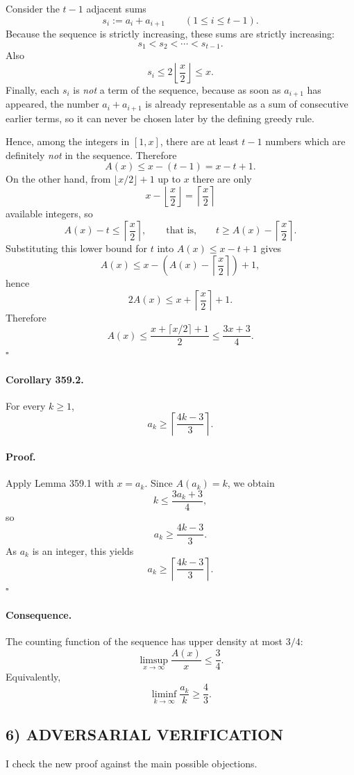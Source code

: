 Consider the $t-1$ adjacent sums
\[
s_i:=a_i+a_{i+1}\qquad (1\le i\le t-1).
\]
Because the sequence is strictly increasing, these sums are strictly increasing:
\[
s_1<s_2<\cdots<s_{t-1}.
\]
Also
\[
s_i\le 2\left\lfloor \frac{x}{2}\right\rfloor\le x.
\]
Finally, each $s_i$ is \emph{not} a term of the sequence, because as soon as $a_{i+1}$ has appeared, the number $a_i+a_{i+1}$ is already representable as a sum of consecutive earlier terms, so it can never be chosen later by the defining greedy rule.

Hence, among the integers in $[1,x]$, there are at least $t-1$ numbers which are definitely \emph{not} in the sequence.  Therefore
\[
A(x)\le x-(t-1)=x-t+1.
\]
On the other hand, from $\lfloor x/2\rfloor+1$ up to $x$ there are only
\[
x-\left\lfloor \frac{x}{2}\right\rfloor=\left\lceil \frac{x}{2}\right\rceil
\]
available integers, so
\[
A(x)-t\le \left\lceil \frac{x}{2}\right\rceil,
\qquad\text{that is,}\qquad
t\ge A(x)-\left\lceil \frac{x}{2}\right\rceil.
\]
Substituting this lower bound for $t$ into $A(x)\le x-t+1$ gives
\[
A(x)\le x-\left(A(x)-\left\lceil \frac{x}{2}\right\rceil\right)+1,
\]
hence
\[
2A(x)\le x+\left\lceil \frac{x}{2}\right\rceil+1.
\]
Therefore
\[
A(x)\le \frac{x+\lceil x/2\rceil+1}{2}\le \frac{3x+3}{4}.
\]
\hfill $\square$

\paragraph{Corollary 359.2.}
For every $k\ge 1$,
\[
a_k\ge \left\lceil \frac{4k-3}{3}\right\rceil.
\]

\paragraph{Proof.}
Apply Lemma 359.1 with $x=a_k$.  Since $A(a_k)=k$, we obtain
\[
k\le \frac{3a_k+3}{4},
\]
so
\[
a_k\ge \frac{4k-3}{3}.
\]
As $a_k$ is an integer, this yields
\[
a_k\ge \left\lceil \frac{4k-3}{3}\right\rceil.
\]
\hfill $\square$

\paragraph{Consequence.}
The counting function of the sequence has upper density at most $3/4$:
\[
\limsup_{x\to\infty}\frac{A(x)}{x}\le \frac34.
\]
Equivalently,
\[
\liminf_{k\to\infty}\frac{a_k}{k}\ge \frac43.
\]

\subsection*{6) ADVERSARIAL VERIFICATION}
I check the new proof against the main possible objections.

